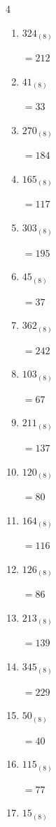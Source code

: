 \begin{multicols}{4}
\begin{enumerate}
  \item $324_{(8)}$

        $=212$

  \item $41_{(8)}$

        $=33$

  \item $270_{(8)}$

        $=184$

\columnbreak %

  \item $165_{(8)}$

        $=117$

  \item $303_{(8)}$

        $=195$

  \item $45_{(8)}$

        $=37$

  \item $362_{(8)}$

        $=242$

  \item $103_{(8)}$

        $=67$

  \item $211_{(8)}$

        $=137$

  \item $120_{(8)}$

        $=80$

  \item $164_{(8)}$

        $=116$

  \item $126_{(8)}$

        $=86$

  \item $213_{(8)}$

        $=139$

  \item $345_{(8)}$

        $=229$

  \item $50_{(8)}$

        $=40$

  \item $115_{(8)}$

        $=77$

  \item $15_{(8)}$


\end{enumerate}
\end{multicols}
